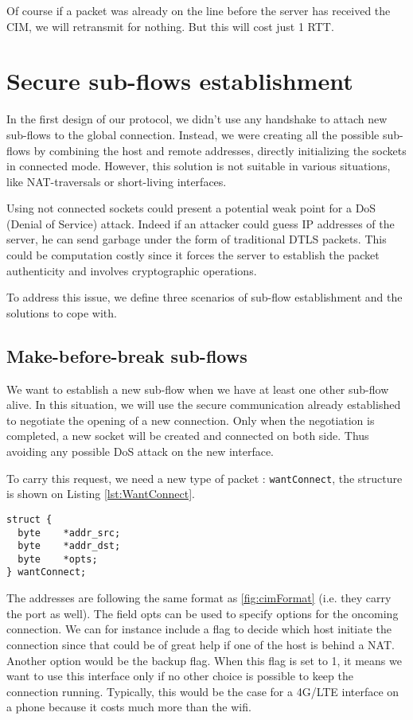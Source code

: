 Of course if a packet was already on the line before the server has received the CIM, we will retransmit for nothing. But this will cost just 1 RTT.


\section{Secure sub-flows establishment}

In the first design of our protocol, we didn't use any handshake to attach new sub-flows to the global connection. Instead, we were creating all the possible sub-flows by combining the host and remote addresses, directly initializing the sockets in connected mode. However, this solution is not suitable in various situations, like NAT-traversals or short-living interfaces. 

Using not connected sockets could present a potential weak point for a DoS (Denial of Service) attack. Indeed if an attacker could guess IP addresses of the server, he can send garbage under the form of traditional DTLS packets. This could be computation costly since it forces the server to establish the packet authenticity and involves cryptographic operations.

To address this issue, we define three scenarios of sub-flow establishment and the solutions to cope with.

\subsection{Make-before-break sub-flows}

We want to establish a new sub-flow when we have at least one other sub-flow alive. In this situation, we will use the secure communication already established to negotiate the opening of a new connection. Only when the negotiation is completed, a new socket will be created and connected on both side. Thus avoiding any possible DoS attack on the new interface.

To carry this request, we need a new type of packet : \verb!wantConnect!, the structure is shown on Listing \ref{lst:WantConnect}.

\begin{lstlisting}[caption= wantConnect message structure, label=lst:WantConnect]
struct {
  byte    *addr_src;
  byte    *addr_dst;
  byte    *opts;
} wantConnect;
\end{lstlisting}

The addresses are following the same format as \ref{fig:cimFormat} (i.e. they carry the port as well). The field opts can be used to specify options for the oncoming connection. We can for instance include a flag to decide which host initiate the connection since that could be of great help if one of the host is behind a NAT. Another option would be the backup flag. When this flag is set to 1, it means we want to use this interface only if no other choice is possible to keep the connection running. Typically, this would be the case for a 4G/LTE interface on a phone because it costs much more than the wifi.

